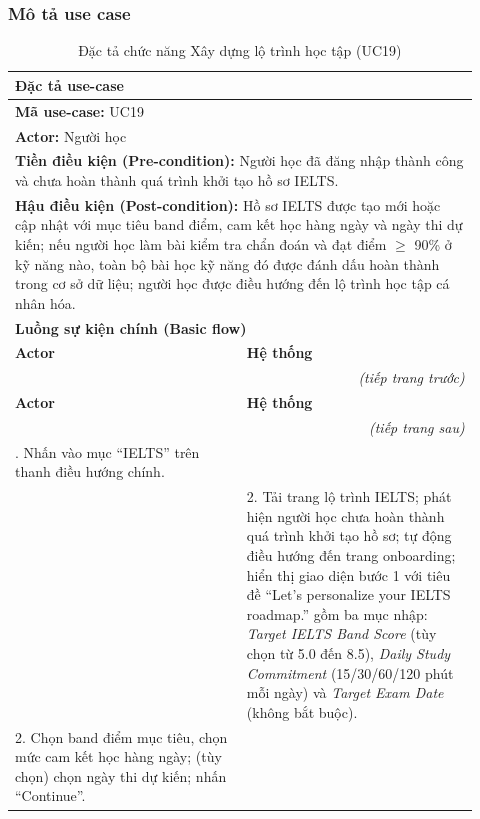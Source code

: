 \subsubsection{Mô tả use case}
\renewcommand{\arraystretch}{1.3}
\begin{longtable}{|p{0.46\linewidth}|p{0.46\linewidth}|}
    \caption{Đặc tả chức năng Xây dựng lộ trình học tập (UC19)} \label{tab:uc19_spec} \\
    \hline
    \multicolumn{2}{|l|}{\textbf{Đặc tả use-case}} \\ \hline
    \multicolumn{2}{|l|}{\textbf{Mã use-case:} UC19} \\ \hline
    \multicolumn{2}{|l|}{\textbf{Actor:} Người học} \\ \hline
    \multicolumn{2}{|p{0.88\linewidth}|}{\textbf{Tiền điều kiện (Pre-condition):} Người học đã đăng nhập thành công và chưa hoàn thành quá trình khởi tạo hồ sơ IELTS.} \\ \hline
    \multicolumn{2}{|p{0.88\linewidth}|}{\textbf{Hậu điều kiện (Post-condition):} Hồ sơ IELTS được tạo mới hoặc cập nhật với mục tiêu band điểm, cam kết học hàng ngày và ngày thi dự kiến; nếu người học làm bài kiểm tra chẩn đoán và đạt điểm $\geq$ 90\% ở kỹ năng nào, toàn bộ bài học kỹ năng đó được đánh dấu hoàn thành trong cơ sở dữ liệu; người học được điều hướng đến lộ trình học tập cá nhân hóa.} \\ \hline
    \multicolumn{2}{|l|}{\textbf{Luồng sự kiện chính (Basic flow)}} \\ \hline
    \textbf{Actor} & \textbf{Hệ thống} \\ \hline
    \endfirsthead
    \multicolumn{2}{r}{\textit{(tiếp trang trước)}} \\
    \hline
    \textbf{Actor} & \textbf{Hệ thống} \\ \hline
    \endhead
    \hline
    \multicolumn{2}{r}{\textit{(tiếp trang sau)}} \\
    \endfoot
    \hline
    \endlastfoot
    1. Nhấn vào mục ``IELTS'' trên thanh điều hướng chính. & \\ \hline
    & 2. Tải trang lộ trình IELTS; phát hiện người học chưa hoàn thành quá trình khởi tạo hồ sơ; tự động điều hướng đến trang onboarding; hiển thị giao diện bước 1 với tiêu đề ``Let's personalize your IELTS roadmap.'' gồm ba mục nhập: \textit{Target IELTS Band Score} (tùy chọn từ 5.0 đến 8.5), \textit{Daily Study Commitment} (15/30/60/120 phút mỗi ngày) và \textit{Target Exam Date} (không bắt buộc). \\ \hline
    2. Chọn band điểm mục tiêu, chọn mức cam kết học hàng ngày; (tùy chọn) chọn ngày thi dự kiến; nhấn ``Continue''. & \\ \hline

\end{longtable}
